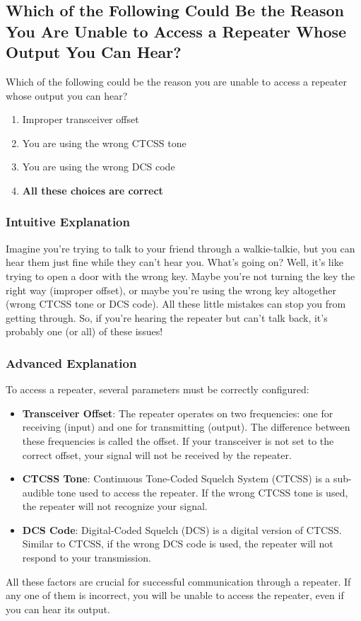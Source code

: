 \subsection{Which of the Following Could Be the Reason You Are Unable to Access a Repeater Whose Output You Can Hear?}\label{T2B04}

\begin{tcolorbox}[colback=gray!10!white,colframe=black!75!black,title=T2B04]
Which of the following could be the reason you are unable to access a repeater whose output you can hear?
\begin{enumerate}[label=\Alph*)]
    \item Improper transceiver offset
    \item You are using the wrong CTCSS tone
    \item You are using the wrong DCS code
    \item \textbf{All these choices are correct}
\end{enumerate}
\end{tcolorbox}

\subsubsection{Intuitive Explanation}
Imagine you’re trying to talk to your friend through a walkie-talkie, but you can hear them just fine while they can’t hear you. What’s going on? Well, it’s like trying to open a door with the wrong key. Maybe you’re not turning the key the right way (improper offset), or maybe you’re using the wrong key altogether (wrong CTCSS tone or DCS code). All these little mistakes can stop you from getting through. So, if you’re hearing the repeater but can’t talk back, it’s probably one (or all) of these issues!

\subsubsection{Advanced Explanation}
To access a repeater, several parameters must be correctly configured:
\begin{itemize}
    \item \textbf{Transceiver Offset}: The repeater operates on two frequencies: one for receiving (input) and one for transmitting (output). The difference between these frequencies is called the offset. If your transceiver is not set to the correct offset, your signal will not be received by the repeater.
    \item \textbf{CTCSS Tone}: Continuous Tone-Coded Squelch System (CTCSS) is a sub-audible tone used to access the repeater. If the wrong CTCSS tone is used, the repeater will not recognize your signal.
    \item \textbf{DCS Code}: Digital-Coded Squelch (DCS) is a digital version of CTCSS. Similar to CTCSS, if the wrong DCS code is used, the repeater will not respond to your transmission.
\end{itemize}
All these factors are crucial for successful communication through a repeater. If any one of them is incorrect, you will be unable to access the repeater, even if you can hear its output.


